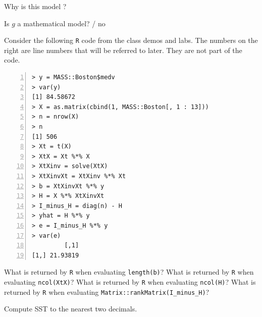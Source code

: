 \documentclass[12pt]{article}
\begin{document}

  Why is this model ?\\


  Is $g$ a mathematical model?  / no 
\eenum
\pagebreak

\problem Consider the following \texttt{R} code from the class demos and labs. The numbers on the right are line numbers that will be referred to later. They are not part of the code.
\begin{Verbatim}[frame=single,numbers=left]
> y = MASS::Boston$medv
> var(y)
[1] 84.58672
> X = as.matrix(cbind(1, MASS::Boston[, 1 : 13]))
> n = nrow(X)
> n
[1] 506
> Xt = t(X)
> XtX = Xt %*% X
> XtXinv = solve(XtX)
> XtXinvXt = XtXinv %*% Xt
> b = XtXinvXt %*% y
> H = X %*% XtXinvXt
> I_minus_H = diag(n) - H
> yhat = H %*% y
> e = I_minus_H %*% y
> var(e)
         [,1]
[1,] 21.93819
\end{Verbatim}


\benum
{} What is returned by \texttt{R} when evaluating \texttt{length(b)}?  
 What is returned by \texttt{R} when evaluating \texttt{ncol(XtX)}? 
 What is returned by \texttt{R} when evaluating \texttt{ncol(H)}? 
 What is returned by \texttt{R} when evaluating \texttt{Matrix::rankMatrix(I\_minus\_H)}? 

 Compute SST to the nearest two decimals.
\end{document}
